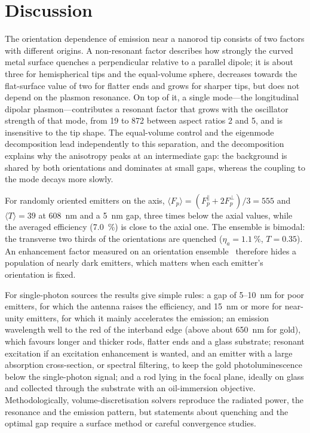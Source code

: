 \documentclass[11pt,a4paper]{article}
\newcommand{\Fp}{F_p}
\begin{document}
\section{Discussion}
The orientation dependence of emission near a nanorod tip consists of two factors with different origins. A
non-resonant factor describes how strongly the curved metal surface quenches a perpendicular relative to a parallel
dipole; it is about three for hemispherical tips and the equal-volume sphere, decreases towards the flat-surface
value of two for flatter ends and grows for sharper tips, but does not depend on the plasmon resonance. On top of it,
a single mode---the longitudinal dipolar plasmon---contributes a resonant factor that grows with the oscillator
strength of that mode, from 19 to 872 between aspect ratios 2 and 5, and is insensitive to the tip shape. The
equal-volume control and the eigenmode decomposition lead independently to this separation, and the decomposition
explains why the anisotropy peaks at an intermediate gap: the background is shared by both orientations and
dominates at small gaps, whereas the coupling to the mode decays more slowly.

For randomly oriented emitters on the axis, $\langle\Fp\rangle=(\Fp^{\parallel}+2\Fp^{\perp})/3=555$ and
$\langle T\rangle=39$ at \SI{608}{nm} and a \SI{5}{nm} gap, three times below the axial values, while the averaged
efficiency (\SI{7.0}{\percent}) is close to the axial one. The ensemble is bimodal: the transverse two thirds of the
orientations are quenched ($\eta_a=\SI{1.1}{\percent}$, $T=0.35$). An enhancement factor measured on an orientation
ensemble~\cite{yuan,khatua} therefore hides a population of nearly dark emitters, which matters when each emitter's
orientation is fixed.

For single-photon sources the results give simple rules: a gap of 5--\SI{10}{nm} for poor emitters, for which the
antenna raises the efficiency, and \SI{15}{nm} or more for near-unity emitters, for which it mainly accelerates the
emission; an emission wavelength well to the red of the interband edge (above about \SI{650}{nm} for gold), which
favours longer and thicker rods, flatter ends and a glass substrate; resonant excitation if an excitation enhancement
is wanted, and an emitter with a large absorption cross-section, or spectral filtering, to keep the gold
photoluminescence below the single-photon signal; and a rod lying in the focal plane, ideally on glass and collected through the substrate with an
oil-immersion objective. Methodologically, volume-discretisation
solvers reproduce the radiated power, the resonance and the emission pattern, but statements about quenching and the
optimal gap require a surface method or careful convergence studies.
\end{document}
